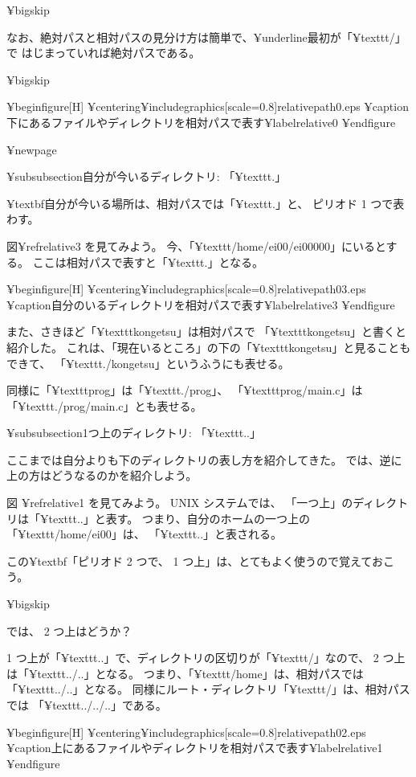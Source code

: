 {¥bigskip

なお、絶対パスと相対パスの見分け方は簡単で、¥underline{最初が「¥texttt{/}」で
はじまっていれば絶対パス}である。

¥bigskip

¥begin{figure}[H]
¥centering{¥includegraphics[scale=0.8]{relativepath0.eps}}
¥caption{下にあるファイルやディレクトリを相対パスで表す}¥label{relative0}
¥end{figure}

¥newpage

¥subsubsection{自分が今いるディレクトリ: 「¥texttt{.}」}

¥textbf{自分が今いる場所}は、相対パスでは「¥texttt{.}」と、
ピリオド 1 つで表わす。

図¥ref{relative3} を見てみよう。
今、「¥texttt{/home/ei00/ei00000}」にいるとする。
ここは相対パスで表すと「¥texttt{.}」となる。

¥begin{figure}[H]
¥centering{¥includegraphics[scale=0.8]{relativepath03.eps}}
¥caption{自分のいるディレクトリを相対パスで表す}¥label{relative3}
¥end{figure}

また、さきほど「¥texttt{kongetsu}」は相対パスで
「¥texttt{kongetsu}」と書くと紹介した。
これは、「現在いるところ」の下の「¥texttt{kongetsu}」と見ることもできて、
「¥texttt{./kongetsu}」というふうにも表せる。

同様に「¥texttt{prog}」は「¥texttt{./prog}」、
「¥texttt{prog/main.c}」は「¥texttt{./prog/main.c}」とも表せる。

¥subsubsection{1つ上のディレクトリ: 「¥texttt{..}」}

ここまでは自分よりも下のディレクトリの表し方を紹介してきた。
では、逆に上の方はどうなるのかを紹介しよう。

図 ¥ref{relative1} を見てみよう。
 UNIX システムでは、 「一つ上」のディレクトリは「¥texttt{..}」と表す。
つまり、自分のホームの一つ上の「¥texttt{/home/ei00}」は、
「¥texttt{..}」と表される。

この¥textbf{「ピリオド 2 つで、 1 つ上」}は、とてもよく使うので覚えておこう。

¥bigskip

では、 2 つ上はどうか？

1 つ上が「¥texttt{..}」で、ディレクトリの区切りが「¥texttt{/}」なので、
2 つ上は「¥texttt{../..}」となる。
つまり、「¥texttt{/home}」は、相対パスでは「¥texttt{../..}」となる。
同様にルート・ディレクトリ「¥texttt{/}」は、相対パスでは
「¥texttt{../../..}」である。

¥begin{figure}[H]
¥centering{¥includegraphics[scale=0.8]{relativepath02.eps}}
¥caption{上にあるファイルやディレクトリを相対パスで表す}¥label{relative1}
¥end{figure}

}
